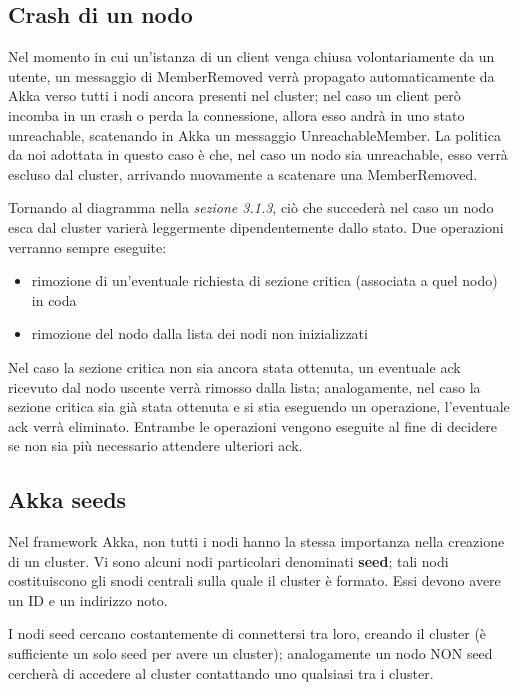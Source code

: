 \subsection{Crash di un nodo}
Nel momento in cui un'istanza di un client venga chiusa volontariamente da un utente, un messaggio di MemberRemoved verrà propagato automaticamente da Akka verso tutti i nodi ancora presenti nel cluster; nel caso un client però incomba in un crash o perda la connessione, allora esso andrà in uno stato unreachable, scatenando in Akka un messaggio UnreachableMember. La politica da noi adottata in questo caso è che, nel caso un nodo sia unreachable, esso verrà escluso dal cluster, arrivando nuovamente a scatenare una MemberRemoved.\newline

\noindent Tornando al diagramma nella \textit{sezione 3.1.3}, ciò che succederà nel caso un nodo esca dal cluster varierà leggermente dipendentemente dallo stato.\newline
Due operazioni verranno sempre eseguite:
\begin{itemize}
    \item rimozione di un'eventuale richiesta di sezione critica (associata a quel nodo) in coda
    \item rimozione del nodo dalla lista dei nodi non inizializzati
\end{itemize}
Nel caso la sezione critica non sia ancora stata ottenuta, un eventuale ack ricevuto dal nodo uscente verrà rimosso dalla lista; analogamente, nel caso la sezione critica sia già stata ottenuta e si stia eseguendo un operazione, l'eventuale ack verrà eliminato. Entrambe le operazioni vengono eseguite al fine di decidere se non sia più necessario attendere ulteriori ack.
\subsection{Akka seeds}
Nel framework Akka, non tutti i nodi hanno la stessa importanza nella creazione di un cluster.\newline
Vi sono alcuni nodi particolari denominati \textbf{seed}; tali nodi costituiscono gli snodi centrali sulla quale il cluster è formato. Essi devono avere un ID e un indirizzo noto.\newline

\noindent I nodi seed cercano costantemente di connettersi tra loro, creando il cluster (è sufficiente un solo seed per avere un cluster); analogamente un nodo NON seed cercherà di accedere al cluster contattando uno qualsiasi tra i cluster.\newline


